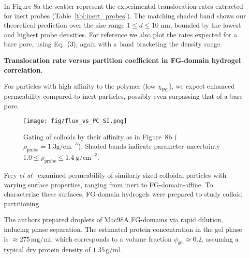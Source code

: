 \documentclass[10pt, a4paper]{article}
\newcommand\todo[1]{\textcolor{red}{#1}}
\begin{document}
\begin{multicols}{2}
In Figure 8a the scatter represent the experimental translocation rates extracted for inert probes (Table~\ref{tbl:inert_probes}).
The matching shaded band shows our theoretical prediction over the size range $1 \le d \le 10$ nm, bounded by the lowest and highest probe densities.
For reference we also plot the rates expected for a bare pore, using Eq.~(3), again with a band bracketing the density range.




\textbf{Translocation rate versus partition coefficient in FG-domain hydrogel correlation.}

For particles with high affinity to the polymer (low $\chi_{\text{PC}}$), we expect enhanced permeability compared to inert particles, possibly even surpassing that of a bare pore.

\begin{figure}[H]
    \centering
    \texttt{[image: fig/flux\_vs\_PC\_SI.png]}
    \caption{%
    Gating of colloids by their affinity as in Figure~8b ($\rho_{\text{probe}} =1.3 \text{g/cm}^{-3}$).
    Shaded bands indicate parameter uncertainty $1.0 \le \rho_{\text{probe}} \le 1.4\;\text{g/cm}^{-3}$.
    }
    \label{fig:flux_vs_PC}
\end{figure}

Frey \textit{et al}~\cite{Frey2018} examined permeability of similarly sized colloidal particles with varying surface properties, ranging from inert to FG-domain-affine.
To characterize these surfaces, FG-domain hydrogels were prepared to study colloid partitioning.

The authors prepared droplets of Mac98A FG-domains via rapid dilution, inducing phase separation. 
The estimated protein concentration in the gel phase is $\approx 275 \, \text{mg}/\text{ml}$, which corresponds to a volume fraction $\phi_{\text{gel}} \approx 0.2$, assuming a typical dry protein density of $1.35 \, \text{g}/\text{ml}$.


\end{multicols}
\end{document}
